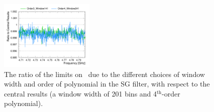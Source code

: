 \begin{figure} [htbp]
  \centering
  \includegraphics[width=0.4\textwidth,height = 0.25\textwidth]{figures/Ratio_gayy_Limits_Comparison_different_SGFilter_AxionRun.png}
  \caption{The ratio of the limits on \gagg\ due to the different choices 
 of window width and order of polynomial in the SG filter, with respect to 
 the central results (a window width of 201 bins and 4$^\text{th}$-order 
 polynomial). }
  \label{fig:syssgfilter}
\end{figure}
 

